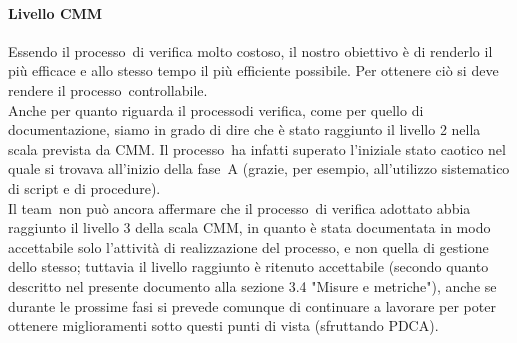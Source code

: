 \documentclass[../PianoDiQualifica.tex]{subfiles}
\begin{document}
\begin{appendices}
			\paragraph{Livello CMM}
			Essendo il processo\g\ di verifica molto costoso, il nostro obiettivo è di renderlo il più efficace e allo stesso tempo il più efficiente possibile. Per ottenere ciò si deve rendere il processo\g\ controllabile.\\
			Anche per quanto riguarda il processo\g di verifica, come per quello di documentazione, siamo in grado di dire che è stato raggiunto il livello 2 nella scala prevista da CMM\g. Il processo\g\ ha infatti superato l'iniziale stato caotico nel quale si trovava all'inizio della fase\g\ A (grazie, per esempio, all'utilizzo sistematico di script e di procedure). \\
			Il team\g\ non può ancora affermare che il processo\g\ di verifica adottato abbia raggiunto il livello 3 della scala CMM\g, in quanto è stata documentata in modo accettabile solo l'attività di realizzazione del processo\g, e non quella di gestione dello stesso; tuttavia il livello raggiunto è ritenuto accettabile (secondo quanto descritto nel presente documento alla sezione 3.4 "Misure e metriche"), anche se durante le prossime fasi si prevede comunque di continuare a lavorare per poter ottenere miglioramenti sotto questi punti di vista (sfruttando PDCA\g).
\end{appendices}
\end{document}
